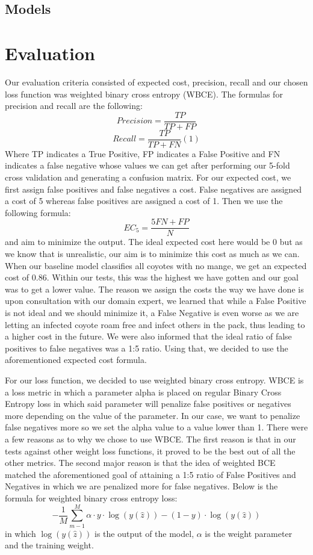 \documentclass{article}
\begin{document}
\subsection{Models}

\section{Evaluation}
Our evaluation criteria consisted of expected cost, precision, recall and our chosen loss function was weighted binary cross entropy (WBCE). The formulas for precision and recall are the following:
\[Precision = \frac{TP}{TP+FP}\]
\[Recall = \frac{TP}{TP+FN}	    (1)\]     %
Where TP indicates a True Positive, FP indicates a False Positive and FN indicates a false negative whose values we can get after performing our 5-fold cross validation and generating a confusion matrix. For our expected cost, we first assign false positives and false negatives a cost. False negatives are assigned a cost of 5 whereas false positives are assigned a cost of 1. Then we use the following formula: 
\[EC_5 = \frac{5FN + FP}{N}\]
and aim to minimize the output. The ideal expected cost here would be 0 but as we know that is unrealistic, our aim is to minimize this cost as much as we can. When our baseline model classifies all coyotes with no mange, we get an expected cost of 0.86. Within our tests, this was the highest we have gotten and our goal was to get a lower value.  The reason we assign the costs the way we have done is upon consultation with our domain expert, we learned that while a False Positive is not ideal and we should minimize it, a False Negative is even worse as we are letting an infected coyote roam free and infect others in the pack, thus leading to a higher cost in the future. We were also informed that the ideal ratio of false positives to false negatives was a 1:5 ratio. Using that, we decided to use the aforementioned expected cost formula.

For our loss function, we decided to use weighted binary cross entropy. WBCE is a loss metric in which a parameter alpha is placed on  regular Binary Cross Entropy loss in which said parameter will penalize false positives or negatives more depending on the value of the parameter. In our case, we want to penalize false negatives more so we set the alpha value to a value lower than 1. There were a few reasons as to why we chose to use WBCE. The first reason is that in our tests against other weight loss functions, it proved to be the best out of all the other metrics. The second major reason is that the idea of weighted BCE matched the aforementioned goal of attaining a 1:5 ratio of False Positives and Negatives in which we are penalized more for false negatives. Below is the formula for weighted binary cross entropy loss:
\[
-\frac{1}{M}\sum_{m-1}^{M}\alpha \cdot y \cdot \log(y(\hat{z}))-(1-y)\cdot\log(y(\hat{z})) 
\]
in which $\log(y(\hat{z}))$ is the output of the model, $\alpha$ is the weight parameter and the training weight.
\end{document}
